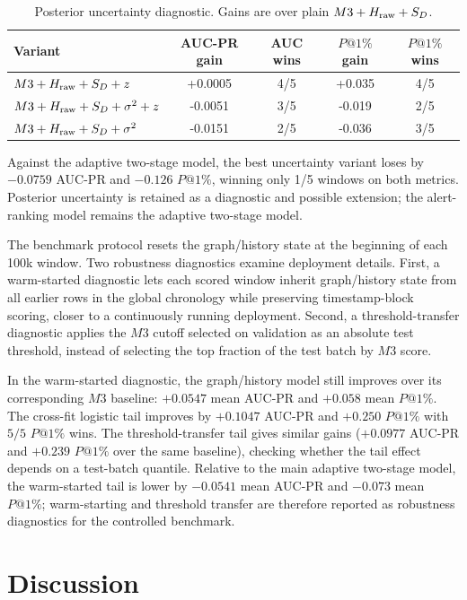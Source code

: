 \documentclass[11pt]{article}
\theoremstyle{definition}
\theoremstyle{remark}
\begin{document}
\begin{table}[h]
\centering
\caption{Posterior uncertainty diagnostic. Gains are over plain $M3+H_{\rm raw}+S_D$.}
\label{tab:posterior-diagnostic}
\begin{tabular}{lcccc}
\toprule
Variant & AUC-PR gain & AUC wins & $P@1\%$ gain & $P@1\%$ wins \\
\midrule
$M3+H_{\rm raw}+S_D+z$ & +0.0005 & 4/5 & +0.035 & 4/5 \\
$M3+H_{\rm raw}+S_D+\sigma^2+z$ & -0.0051 & 3/5 & -0.019 & 2/5 \\
$M3+H_{\rm raw}+S_D+\sigma^2$ & -0.0151 & 2/5 & -0.036 & 3/5 \\
\bottomrule
\end{tabular}
\end{table}

Against the adaptive two-stage model, the best uncertainty variant loses by $-0.0759$ AUC-PR and $-0.126$ $P@1\%$, winning only 1/5 windows on both metrics. Posterior uncertainty is retained as a diagnostic and possible extension; the alert-ranking model remains the adaptive two-stage model.

The benchmark protocol resets the graph/history state at the beginning of each 100k window. Two robustness diagnostics examine deployment details. First, a warm-started diagnostic lets each scored window inherit graph/history state from all earlier rows in the global chronology while preserving timestamp-block scoring, closer to a continuously running deployment. Second, a threshold-transfer diagnostic applies the $M3$ cutoff selected on validation as an absolute test threshold, instead of selecting the top fraction of the test batch by $M3$ score.

In the warm-started diagnostic, the graph/history model still improves over its corresponding $M3$ baseline: $+0.0547$ mean AUC-PR and $+0.058$ mean $P@1\%$. The cross-fit logistic tail improves by $+0.1047$ AUC-PR and $+0.250$ $P@1\%$ with $5/5$ $P@1\%$ wins. The threshold-transfer tail gives similar gains ($+0.0977$ AUC-PR and $+0.239$ $P@1\%$ over the same baseline), checking whether the tail effect depends on a test-batch quantile. Relative to the main adaptive two-stage model, the warm-started tail is lower by $-0.0541$ mean AUC-PR and $-0.073$ mean $P@1\%$; warm-starting and threshold transfer are therefore reported as robustness diagnostics for the controlled benchmark.

\section{Discussion}
\end{document}
